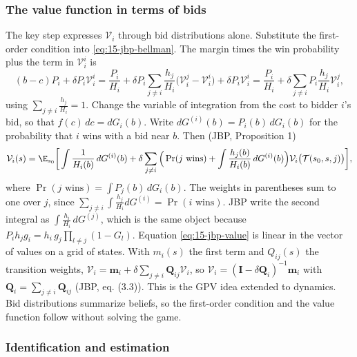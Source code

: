 \subsubsection{The value function in terms of bids}

The key step expresses $\mathcal V_i$ through bid distributions alone. Substitute the first-order condition into
\eqref{eq:15-jbp-bellman}. The margin times the win probability plus the term in $\mathcal V_i^i$ is
\[
(b-c)P_i+\delta P_i\mathcal V_i^i=\frac{P_i}{H_i}+\delta P_i\sum_{j\neq i}\frac{h_j}{H_i}\big(\mathcal V_i^j-\mathcal V_i^i\big)+\delta P_i\mathcal V_i^i
=\frac{P_i}{H_i}+\delta\sum_{j\neq i}P_i\frac{h_j}{H_i}\mathcal V_i^j,
\]
using $\sum_{j\neq i}\frac{h_j}{H_i}=1$. Change the variable of integration from the cost to bidder $i$'s
bid, so that $f(c)\,dc=dG_i(b)$. Write $dG^{(i)}(b)=P_i(b)\,dG_i(b)$ for the probability that $i$ wins
with a bid near $b$. Then (JBP, Proposition 1)
\begin{equation}\label{eq:15-jbp-value}
\mathcal V_i(s)=\E_{s_0}\bigg[\int\frac{1}{H_i(b)}\,dG^{(i)}(b)+\delta\sum_{j\neq i}\Big(\Pr(j\text{ wins})+\int\frac{h_j(b)}{H_i(b)}\,dG^{(i)}(b)\Big)\mathcal V_i\big(\mathcal T(s_0,s,j)\big)\bigg],
\end{equation}
where $\Pr(j\text{ wins})=\int P_j(b)\,dG_i(b)$. The weights in parentheses sum to one over $j$, since
$\sum_{j\neq i}\int\frac{h_j}{H_i}dG^{(i)}=\Pr(i\text{ wins})$. JBP write the second integral as
$\int\frac{h_i}{H_i}\,dG^{(j)}$, which is the same object because
$P_ih_jg_i=h_i\,g_j\prod_{l\neq j}(1-G_l)$. Equation \eqref{eq:15-jbp-value} is linear in the vector of
values on a grid of states. With $m_i(s)$ the first term and $Q_{ij}(s)$ the transition weights,
$\bm{\mathcal V}_i=\bm m_i+\delta\sum_{j\neq i}\bm Q_{ij}\bm{\mathcal V}_i$, so $\bm{\mathcal V}_i=(\bm I-\delta\bm Q_i)^{-1}\bm m_i$ with $\bm Q_i=\sum_{j\neq i}\bm Q_{ij}$
(JBP, eq. (3.3)). This is the GPV idea extended to dynamics. Bid distributions summarize beliefs, so the
first-order condition and the value function follow without solving the game.

\subsubsection{Identification and estimation}

